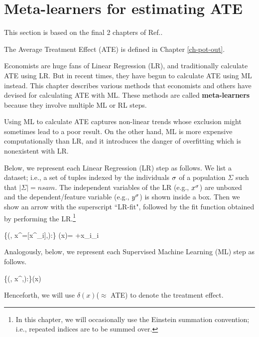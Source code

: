\chapter{Meta-learners
for estimating ATE}
\label{ch-meta-learners}


This section
is based on the final 2 chapters of
Ref.\cite{alves-book}.

The Average Treatment Effect (ATE)
is defined in Chapter \ref{ch-pot-out}.

Economists are huge fans of Linear Regression (LR),
and traditionally calculate  ATE using LR.
But in recent times,
they have begun to
calculate ATE using 
ML instead. 
This chapter describes various methods
that economists and others have devised
for calculating ATE with ML.
These methods
are called {\bf meta-learners}
because they involve multiple
ML or RL steps.

Using ML
to calculate
ATE
captures non-linear trends
whose exclusion might sometimes lead to a poor result. 
On the other hand,
ML is more expensive computationally
than LR, 
and it introduces
the danger of overfitting
which is nonexistent with LR.




Below,
we represent each
Linear Regression (LR) step
as follows. 
We list a dataset; i.e., a 
set of tuples indexed by
the individuals $\sigma$
of a population $\Sigma$
such that $|\Sigma|=nsam$.
The independent variables 
of the LR (e.g., $x^\sigma$)
are unboxed and the
 dependent/feature 
variable (e.g., $y^\sigma$)
is shown inside a box.
Then we show an arrow with the
superscript ``LR-fit",
followed by the fit function
obtained by performing the LR.\footnote{
In this chapter,
we will occasionally
use the Einstein summation convention;
i.e.,
repeated indices are to be summed over.}



\beq
\{(\s, x^\s =[x^\s_i],):\s\in \Sigma\}
\lrarr
 \haty(x)=
\alp +x_i\beta_i
\eeq


Analogously, below,
we represent each
Supervised Machine
 Learning (ML) step as follows.


\beq
\{(\s, x^\s,):\s\in \Sigma\}\mlarr \haty(x)
\label{eq-gen-ml}
\eeq


Henceforth, we will use $\delta(x)$($\approx$ ATE) to
denote the treatment effect.



